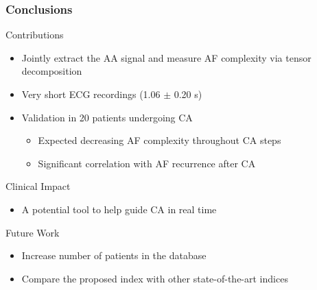 \documentclass{beamer}
\begin{document}
	\begin{frame}
		\frametitle{Conclusions} 
		
		\begin{block}{Contributions}
			\begin{itemize}
				\item Jointly extract the AA signal and measure AF complexity via tensor decomposition
				\item Very short ECG recordings (1.06 $\pm$ 0.20 s)
				\item Validation in 20 patients undergoing CA
				\begin{itemize}
					\item Expected decreasing AF complexity throughout CA steps
					\item Significant correlation with AF recurrence after CA
				\end{itemize}
			\end{itemize}
		\end{block}
		
		\begin{block}{Clinical Impact}
			\begin{itemize}
				\item A potential tool to help guide CA in real time
			\end{itemize}
		\end{block}

		\begin{block}{Future Work}
			\begin{itemize}
				\item Increase number of patients in the database
				\item Compare the proposed index with other state-of-the-art indices
			\end{itemize}
		\end{block}
		
	\end{frame}
		
\end{document}
